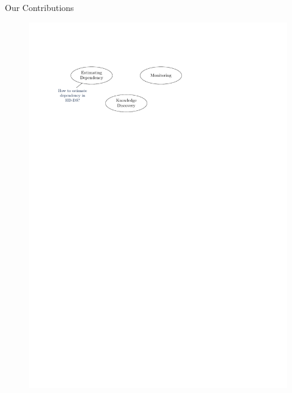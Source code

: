 \documentclass[16pt,usenames,dvipsnames, notheorems]{beamer}
\theoremstyle{definition}
\theoremstyle{example}
\theoremstyle{plain}
\begin{document}
\begin{frame}{Our Contributions}
\begin{figure}
\begin{overprint}
		 \includegraphics[width=1.0 \linewidth]{figures/outline_c_1-compressed.pdf}

\end{overprint}
\end{figure}
\end{frame}
\end{document}
